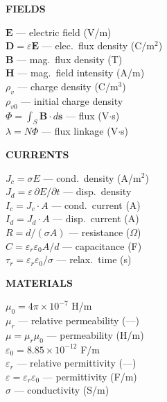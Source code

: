 \documentclass[6pt,letterpaper]{article}
\newcommand{\shead}[3]{%
  \noindent\colorbox{#1}{\parbox{\dimexpr\linewidth-2\fboxsep\relax}%
  {\color{#2}\bfseries\fontsize{6}{7}\selectfont #3}}\vspace{0.5pt}}
\begin{document}
\vfill
\vspace{2pt}
\noindent
\begin{minipage}[t]{0.19\linewidth}
\shead{purplebg}{purple}{FIELDS}
\begin{ebox}
$\mathbf{E}$ — electric field (V/m)\\
$\mathbf{D}=\varepsilon\mathbf{E}$ — elec.\ flux density (C/m$^2$)\\
$\mathbf{B}$ — mag.\ flux density (T)\\
$\mathbf{H}$ — mag.\ field intensity (A/m)\\
$\rho_v$ — charge density (C/m$^3$)\\
$\rho_{v0}$ — initial charge density\\
$\Phi=\int_S\mathbf{B}\cdot d\mathbf{s}$ — flux (V$\cdot$s)\\
$\lambda=N\Phi$ — flux linkage (V$\cdot$s)
\end{ebox}
\end{minipage}\hfill
\begin{minipage}[t]{0.19\linewidth}
\shead{tealbg}{teal}{CURRENTS}
\begin{ebox}
$J_c=\sigma E$ — cond.\ density (A/m$^2$)\\
$J_d=\varepsilon\,\partial E/\partial t$ — disp.\ density\\
$I_c=J_c\cdot A$ — cond.\ current (A)\\
$I_d=J_d\cdot A$ — disp.\ current (A)\\
$R=d/(\sigma A)$ — resistance ($\Omega$)\\
$C=\varepsilon_r\varepsilon_0 A/d$ — capacitance (F)\\
$\tau_r=\varepsilon_r\varepsilon_0/\sigma$ — relax.\ time (s)
\end{ebox}
\end{minipage}\hfill
\begin{minipage}[t]{0.19\linewidth}
\shead{coralbg}{coral}{MATERIALS}
\begin{ebox}
$\mu_0=4\pi\!\times\!10^{-7}$ H/m\\
$\mu_r$ — relative permeability (—)\\
$\mu=\mu_r\mu_0$ — permeability (H/m)\\[2pt]
$\varepsilon_0=8.85\!\times\!10^{-12}$ F/m\\
$\varepsilon_r$ — relative permittivity (—)\\
$\varepsilon=\varepsilon_r\varepsilon_0$ — permittivity (F/m)\\[2pt]
$\sigma$ — conductivity (S/m)
\end{ebox}
\end{minipage}\hfill
\end{document}
